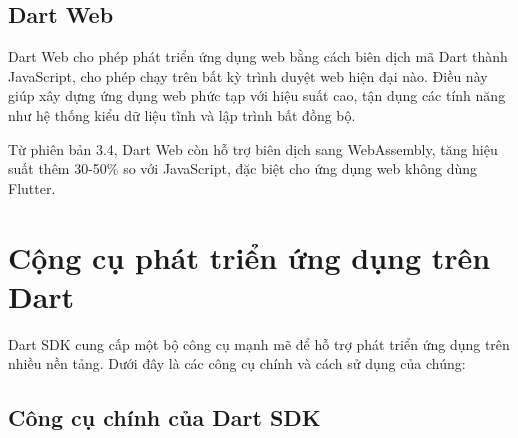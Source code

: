 \documentclass[../DoAn.tex]{subfiles}
\numberwithin{figure}{chapter}
\begin{document}
\begin{itemize}
\subsection{Dart Web}

Dart Web cho phép phát triển ứng dụng web bằng cách biên dịch mã Dart thành JavaScript, cho phép chạy trên bất kỳ trình duyệt web hiện đại nào. Điều này giúp xây dựng ứng dụng web phức tạp với hiệu suất cao, tận dụng các tính năng như hệ thống kiểu dữ liệu tĩnh và lập trình bất đồng bộ.

Từ phiên bản 3.4, Dart Web còn hỗ trợ biên dịch sang WebAssembly, tăng hiệu suất thêm 30-50\% so với JavaScript, đặc biệt cho ứng dụng web không dùng Flutter.

\section{Cộng cụ phát triển ứng dụng trên Dart}

Dart SDK cung cấp một bộ công cụ mạnh mẽ để hỗ trợ phát triển ứng dụng trên nhiều nền tảng. Dưới đây là các công cụ chính và cách sử dụng của chúng:

\subsection{Công cụ chính của Dart SDK}


\end{itemize}
\end{document}
